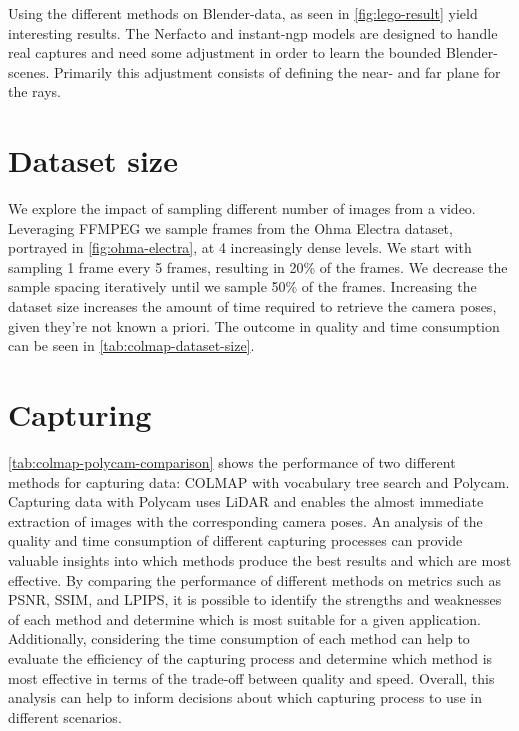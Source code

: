 

Using the different methods on Blender-data, as seen in \autoref{fig:lego-result} yield interesting results. The Nerfacto and instant-ngp models are designed to handle real captures and need some adjustment in order to learn the bounded Blender-scenes. Primarily this adjustment consists of defining the near- and far plane for the rays.



\section{Dataset size}
We explore the impact of sampling different number of images from a video. Leveraging FFMPEG we sample frames from the Ohma Electra dataset, portrayed in \autoref{fig:ohma-electra}, at 4 increasingly dense levels. We start with sampling 1 frame every 5 frames, resulting in 20\% of the frames. We decrease the sample spacing iteratively until we sample 50\% of the frames. Increasing the dataset size increases the amount of time required to retrieve the camera poses, given they're not known a priori. The outcome in quality and time consumption can be seen in \autoref{tab:colmap-dataset-size}.




\section{Capturing}
\autoref{tab:colmap-polycam-comparison} shows the performance of two different methods for capturing data: COLMAP with vocabulary tree search and Polycam. Capturing data with Polycam uses LiDAR and enables the almost immediate extraction of images with the corresponding camera poses. An analysis of the quality and time consumption of different capturing processes can provide valuable insights into which methods produce the best results and which are most effective. By comparing the performance of different methods on metrics such as PSNR, SSIM, and LPIPS, it is possible to identify the strengths and weaknesses of each method and determine which is most suitable for a given application. Additionally, considering the time consumption of each method can help to evaluate the efficiency of the capturing process and determine which method is most effective in terms of the trade-off between quality and speed. Overall, this analysis can help to inform decisions about which capturing process to use in different scenarios.

